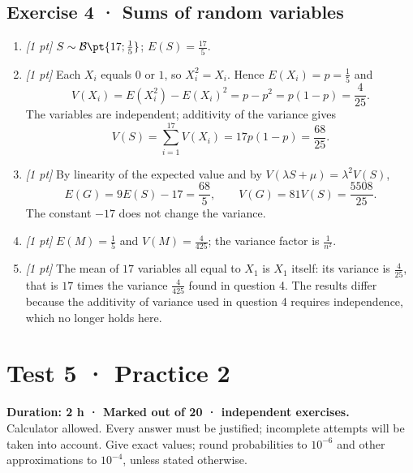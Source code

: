 \subsection*{Exercise 4 · Sums of random variables}\begin{enumerate}

\item \textit{[1 pt]} $S\sim\mathcal B\pt{17;\frac{1}{5}}$; $E(S)=\frac{17}{5}$.

\item \textit{[1 pt]} Each $X_i$ equals $0$ or $1$, so $X_i^2=X_i$. Hence $E(X_i)=p=\frac{1}{5}$ and
\[V(X_i)=E(X_i^2)-E(X_i)^2=p-p^2=p(1-p)=\frac{4}{25}.\]
The variables are independent; additivity of the variance gives
\[V(S)=\sum_{i=1}^{17}V(X_i)=17p(1-p)=\frac{68}{25}.\]

\item \textit{[1 pt]} By linearity of the expected value and by $V(\lambda S+\mu)=\lambda^2V(S)$,
\[E(G)=9E(S)-17=\frac{68}{5},\qquad V(G)=81V(S)=\frac{5508}{25}.\]
The constant $-17$ does not change the variance.

\item \textit{[1 pt]} $E(M)=\frac{1}{5}$ and $V(M)=\frac{4}{425}$; the variance factor is $\frac{1}{n^2}$.

\item \textit{[1 pt]} The mean of $17$ variables all equal to $X_1$ is $X_1$ itself: its variance is $\frac{4}{25}$, that is $17$ times the variance $\frac{4}{425}$ found in question 4. The results differ because the additivity of variance used in question 4 requires independence, which no longer holds here.

\end{enumerate}

\fi

\mxnewpage{}\label{sujet:7-2}

\section*{Test 5 · Practice 2}


\textbf{Duration: 2 h · Marked out of 20 ·  independent exercises.}\\Calculator allowed. Every answer must be justified; incomplete attempts will be taken into account. Give exact values; round probabilities to $10^{-6}$ and other approximations to $10^{-4}$, unless stated otherwise.

